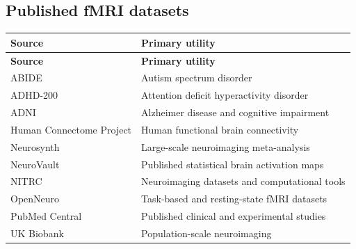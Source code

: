 \subsection{Published fMRI datasets}
\begin{longtable}{@{}p{}p{}@{}}
\toprule
\textbf{Source} & \textbf{Primary utility} \\
\midrule
\endfirsthead
\toprule
\textbf{Source} & \textbf{Primary utility} \\
\midrule
\endhead
ABIDE & Autism spectrum disorder \\
ADHD-200 & Attention deficit hyperactivity disorder \\
ADNI & Alzheimer disease and cognitive impairment \\
Human Connectome Project & Human functional brain connectivity \\
Neurosynth & Large-scale neuroimaging meta-analysis \\
NeuroVault & Published statistical brain activation maps \\
NITRC & Neuroimaging datasets and computational tools \\
OpenNeuro & Task-based and resting-state fMRI datasets \\
PubMed Central & Published clinical and experimental studies \\
UK Biobank & Population-scale neuroimaging \\
\bottomrule
\end{longtable}


